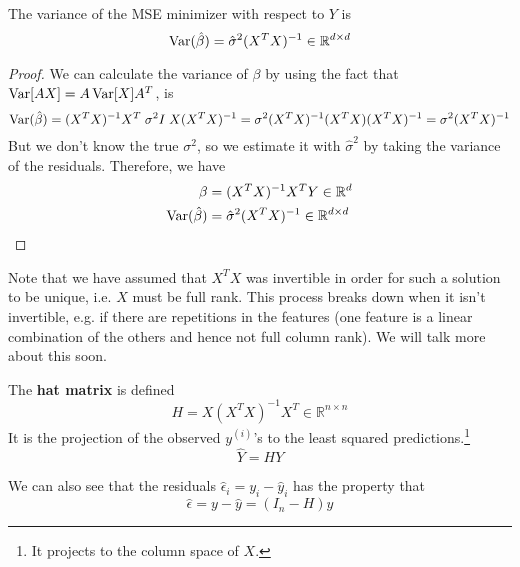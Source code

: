   \begin{corollary}
    The variance of the MSE minimizer with respect to $Y$ is 
    \begin{equation}
      \Var(\hat{\beta}) = \hat{\sigma}^2 (X^T X)^{-1} \in \mathbb{R}^{d \times d}
    \end{equation}
  \end{corollary}
  \begin{proof}
    We can calculate the variance of $\beta$ by using the fact that $\Var[A X] = A \Var[X] A^T$, is
    \begin{equation}
      \Var(\hat{\beta}) = (X^{T} X)^{-1} X^{T} \;\sigma^2 I \; X  (X^{T} X)^{-1} = \sigma^2 (X^{T} X)^{-1} (X^{T} X)  (X^{T} X)^{-1} = \sigma^2  (X^{T} X)^{-1}
    \end{equation}
    But we don't know the true $\sigma^2$, so we estimate it with $\hat{\sigma}^2$ by taking the variance of the residuals. Therefore, we have 
    \begin{align}
      \beta & = (X^T X)^{-1} X^T Y \in \mathbb{R}^d \\
      \Var(\hat{\beta}) & = \hat{\sigma}^2 (X^T X)^{-1} \in \mathbb{R}^{d \times d}
    \end{align}
  \end{proof}

  Note that we have assumed that $X^T X$ was invertible in order for such a solution to be unique, i.e. $X$ must be full rank. This process breaks down when it isn't invertible, e.g. if there are repetitions in the features (one feature is a linear combination of the others and hence not full column rank). We will talk more about this soon. 

  \begin{definition}
    The \textbf{hat matrix} is defined 
    \begin{equation}
      H = X (X^T X)^{-1} X^T \in \mathbb{R}^{n \times n}
    \end{equation}
    It is the projection of the observed $y^{(i)}$'s to the least squared predictions.\footnote{It projects to the column space of $X$.} 
    \begin{equation}
      \hat{Y} = H Y
    \end{equation}
  \end{definition}

  We can also see that the residuals $\hat{\epsilon}_i = y_i - \hat{y}_i$ has the property that 
  \begin{equation}
    \hat{\epsilon} = y - \hat{y} = (I_n - H) y 
  \end{equation}

